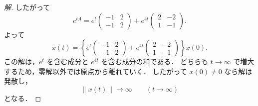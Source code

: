 \documentclass[article,paper=a4paper]{jlreq}
\begin{document}
\begin{proof}[解]
したがって
\[
  e^{tA}
    =
    e^t
    \begin{pmatrix}
      -1 & 2\\
      -1 & 2
    \end{pmatrix}
    +
    e^{4t}
    \begin{pmatrix}
      2 & -2\\
      1 & -1
    \end{pmatrix}.
\]
よって
\[
  x(t)
    =
    \left\{
      e^t
      \begin{pmatrix}
        -1 & 2\\
        -1 & 2
      \end{pmatrix}
      +
      e^{4t}
      \begin{pmatrix}
        2 & -2\\
        1 & -1
      \end{pmatrix}
    \right\}x(0).
\]
この解は，$e^t$ を含む成分と $e^{4t}$ を含む成分の和である．
どちらも $t\to\infty$ で増大するため，零解以外では原点から離れていく．
したがって $x(0)\ne0$ なら解は発散し，
\[
  \|x(t)\|\to\infty
  \qquad (t\to\infty)
\]
となる．


\end{proof}
\end{document}
